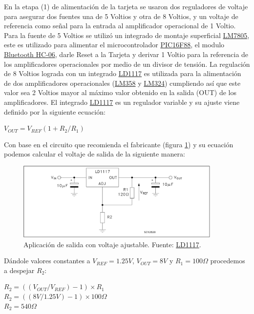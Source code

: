 En la etapa (1) de alimentación de la tarjeta se usaron dos reguladores de voltaje para asegurar dos fuentes una de 5 Voltios y otra de 8 Voltios, y un voltaje de referencia como señal para la entrada al amplificador operacional de 1 Voltio. Para la fuente de 5 Voltios se utilizó un integrado de montaje superficial \href{https://www.sparkfun.com/datasheets/Components/LM7805.pdf}{LM7805}, este es utilizado para alimentar el microcontrolador \href{http://ww1.microchip.com/downloads/en/DeviceDoc/30487c.pdf}{PIC16F88}, el modulo \href{https://www.olimex.com/Products/Components/RF/BLUETOOTH-SERIAL-HC-06/resources/hc06.pdf}{Bluetooth HC-06}, darle Reset a la Tarjeta y derivar 1 Voltio para la referencia de los amplificadores operacionales por medio de un divisor de tensión. La regulación de 8 Voltios lograda con un integrado \href{https://cdn-shop.adafruit.com/product-files/2165/LD1117.pdf}{LD1117} es utilizada para la alimentación de dos amplificadores operacionales (\href{http://www.ti.com/lit/ds/symlink/lm158-n.pdf}{LM358} y \href{http://www.ti.com/lit/ds/symlink/lm124-n.pdf}{LM324}) cumpliendo así que este valor sea 2 Voltios mayor al máximo valor obtenido en la salida (OUT) de los amplificadores. El integrado \href{https://cdn-shop.adafruit.com/product-files/2165/LD1117.pdf}{LD1117} es un regulador variable y su ajuste viene definido por la siguiente ecuación:
\begin{center}
${{V}_{OUT}}={{V}_{REF}}(1+{{R}_{2}}/{{R}_{1}})$
\end{center}
Con base en el circuito que recomienda el fabricante (figura \ref{fig:circuitoejemplo}) y su ecuación podemos calcular el voltaje de salida de la siguiente manera:
\begin{figure}[H]
\centering
\includegraphics[width=0.9\textwidth]{./image/circuitoejemplo.png}
\caption{Aplicación de salida con voltaje ajustable. Fuente: \href{https://cdn-shop.adafruit.com/product-files/2165/LD1117.pdf}{LD1117}.}
\label{fig:circuitoejemplo}
\end{figure}
Dándole valores constantes a ${V}_{REF}=1.25V$, ${V}_{OUT}=8V$ y ${R}_{1}=100\Omega$ procedemos a despejar ${R}_{2}$:
\begin{center}
${R}_{2}=(({V}_{OUT}/{V}_{REF})-1)\times{R}_{1}$\\
${R}_{2}=((8V/1.25V)-1)\times100\Omega$\\
${R}_{2}=540\Omega$
\end{center}

